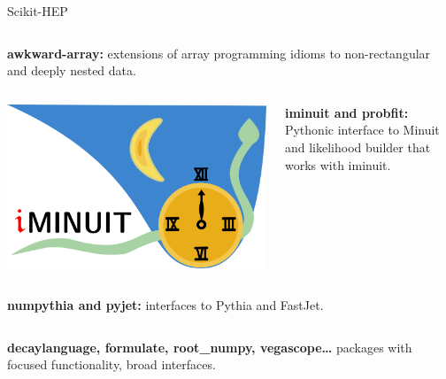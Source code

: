 \documentclass[aspectratio=169]{beamer}
\begin{document}
\begin{frame}{Scikit-HEP}
\begin{columns}
{\bf awkward-array:} extensions of array programming idioms to non-rectangular and deeply nested data.
\end{columns}

\vspace{0.3 cm}
\begin{columns}
\column{2.5 cm}
\hfill \includegraphics[width=0.8\linewidth]{iminuit-logo.png}

{\bf iminuit and probfit:} Pythonic interface to Minuit and likelihood builder that works with iminuit.
\end{columns}

\vspace{0.3 cm}
\begin{columns}
\column{2.5 cm}
{\bf numpythia and pyjet:} interfaces to Pythia and FastJet.
\end{columns}

\vspace{0.3 cm}
\begin{columns}
\column{2.5 cm}
{\bf decaylanguage, formulate, root\_numpy, vegascope\ldots} packages with focused functionality, broad interfaces.
\end{columns}
\end{frame}
\end{document}
